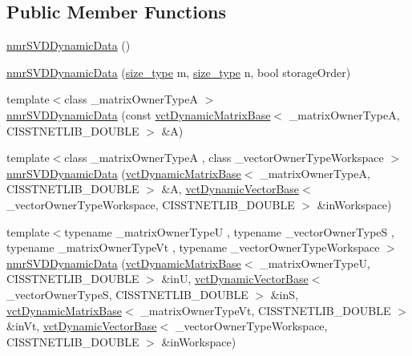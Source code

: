 \subsection*{Public Member Functions}
\begin{DoxyCompactItemize}
\item 
\hyperlink{classnmr_s_v_d_dynamic_data_a4593ac097bf34c9d47dd5376fff4a1ad}{nmr\+S\+V\+D\+Dynamic\+Data} ()
\item 
\hyperlink{classnmr_s_v_d_dynamic_data_a7421212bc93d5918f8cb0304b86af723}{nmr\+S\+V\+D\+Dynamic\+Data} (\hyperlink{classnmr_s_v_d_dynamic_data_ae1d183124f1fe39da05af9cea168101d}{size\+\_\+type} m, \hyperlink{classnmr_s_v_d_dynamic_data_ae1d183124f1fe39da05af9cea168101d}{size\+\_\+type} n, bool storage\+Order)
\item 
{\footnotesize template$<$class \+\_\+matrix\+Owner\+Type\+A $>$ }\\\hyperlink{classnmr_s_v_d_dynamic_data_a30ec8ad8e492d372f738d432812ccb90}{nmr\+S\+V\+D\+Dynamic\+Data} (const \hyperlink{classvct_dynamic_matrix_base}{vct\+Dynamic\+Matrix\+Base}$<$ \+\_\+matrix\+Owner\+Type\+A, C\+I\+S\+S\+T\+N\+E\+T\+L\+I\+B\+\_\+\+D\+O\+U\+B\+L\+E $>$ \&A)
\item 
{\footnotesize template$<$class \+\_\+matrix\+Owner\+Type\+A , class \+\_\+vector\+Owner\+Type\+Workspace $>$ }\\\hyperlink{classnmr_s_v_d_dynamic_data_a9e541e82c336fdf328d07906b01332ff}{nmr\+S\+V\+D\+Dynamic\+Data} (\hyperlink{classvct_dynamic_matrix_base}{vct\+Dynamic\+Matrix\+Base}$<$ \+\_\+matrix\+Owner\+Type\+A, C\+I\+S\+S\+T\+N\+E\+T\+L\+I\+B\+\_\+\+D\+O\+U\+B\+L\+E $>$ \&A, \hyperlink{classvct_dynamic_vector_base}{vct\+Dynamic\+Vector\+Base}$<$ \+\_\+vector\+Owner\+Type\+Workspace, C\+I\+S\+S\+T\+N\+E\+T\+L\+I\+B\+\_\+\+D\+O\+U\+B\+L\+E $>$ \&in\+Workspace)
\item 
{\footnotesize template$<$typename \+\_\+matrix\+Owner\+Type\+U , typename \+\_\+vector\+Owner\+Type\+S , typename \+\_\+matrix\+Owner\+Type\+Vt , typename \+\_\+vector\+Owner\+Type\+Workspace $>$ }\\\hyperlink{classnmr_s_v_d_dynamic_data_a8343a2867cf615e4deb350369e0a29ff}{nmr\+S\+V\+D\+Dynamic\+Data} (\hyperlink{classvct_dynamic_matrix_base}{vct\+Dynamic\+Matrix\+Base}$<$ \+\_\+matrix\+Owner\+Type\+U, C\+I\+S\+S\+T\+N\+E\+T\+L\+I\+B\+\_\+\+D\+O\+U\+B\+L\+E $>$ \&in\+U, \hyperlink{classvct_dynamic_vector_base}{vct\+Dynamic\+Vector\+Base}$<$ \+\_\+vector\+Owner\+Type\+S, C\+I\+S\+S\+T\+N\+E\+T\+L\+I\+B\+\_\+\+D\+O\+U\+B\+L\+E $>$ \&in\+S, \hyperlink{classvct_dynamic_matrix_base}{vct\+Dynamic\+Matrix\+Base}$<$ \+\_\+matrix\+Owner\+Type\+Vt, C\+I\+S\+S\+T\+N\+E\+T\+L\+I\+B\+\_\+\+D\+O\+U\+B\+L\+E $>$ \&in\+Vt, \hyperlink{classvct_dynamic_vector_base}{vct\+Dynamic\+Vector\+Base}$<$ \+\_\+vector\+Owner\+Type\+Workspace, C\+I\+S\+S\+T\+N\+E\+T\+L\+I\+B\+\_\+\+D\+O\+U\+B\+L\+E $>$ \&in\+Workspace)

\end{DoxyCompactItemize}
